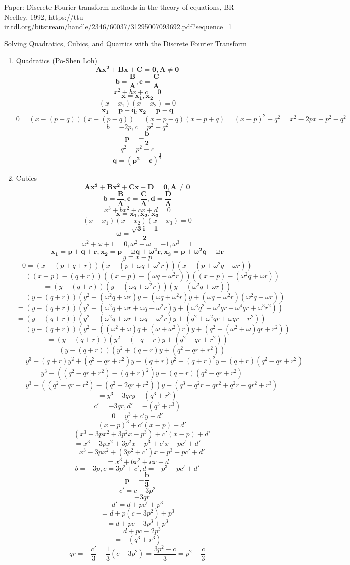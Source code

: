 \documentclass{article}
\begin{document}
Paper: Discrete Fourier transform methods in the theory of equations, BR Neelley, 1992, https://ttu-ir.tdl.org/bitstream/handle/2346/60037/31295007093692.pdf?sequence=1

Solving Quadratics, Cubics, and Quartics with the Discrete Fourier Transform

\begin{enumerate}
\item Quadratics (Po-Shen Loh)
  \[\bm{Ax^2+Bx+C=0, A\neq0}\]
  \[\bm{b=\frac{B}{A}, c=\frac{C}{A}}\]
  \[x^2+bx+c=0\]
  \[\bm{x=x_1,x_2}\]
  \[(x-x_1)(x-x_2)=0\]
  \[\bm{x_1=p+q, x_2=p-q}\]
  \[0=(x-(p+q))(x-(p-q))=(x-p-q)(x-p+q)=(x-p)^2-q^2=x^2-2px+p^2-q^2\]
  \[b=-2p, c=p^2-q^2\]
  \[\bm{p=-\frac{b}{2}}\]
  \[q^2=p^2-c\]
  \[\bm{q=(p^2-c)^\frac{1}{2}}\]
  \newpage
\item Cubics
  \[\bm{Ax^3+Bx^2+Cx+D=0, A\neq0}\]
  \[\bm{b=\frac{B}{A}, c=\frac{C}{A}, d=\frac{D}{A}}\]
  \[x^3+bx^2+cx+d=0\]
  \[\bm{x=x_1,x_2,x_3}\]
  \[(x-x_1)(x-x_2)(x-x_3)=0\]
  \[\bm{\omega=\frac{\sqrt{3}i-1}{2}}\]
  \[\omega^2+\omega+1=0, \omega^2+\omega=-1, \omega^3=1\]
  \[\bm{x_1=p+q+r, x_2=p+\omega q+\omega^2r, x_3=p+\omega^2q+\omega r}\]
  \[y=x-p\]
  \[0=(x-(p+q+r))(x-(p+\omega q+\omega^2r))(x-(p+\omega^2q+\omega r))\]
  \[=((x-p)-(q+r))((x-p)-(\omega q+\omega^2r))((x-p)-(\omega^2q+\omega r))\]
  \[=(y-(q+r))(y-(\omega q+\omega^2r))(y-(\omega^2q+\omega r))\]
  \[=(y-(q+r))(y^2-(\omega^2q+\omega r)y-(\omega q+\omega^2r)y+(\omega q+\omega^2r)(\omega^2q+\omega r))\]
  \[=(y-(q+r))(y^2-(\omega^2q+\omega r+\omega q+\omega^2r)y+(\omega^3q^2+\omega^2qr+\omega^4qr+\omega^3r^2))\]
  \[=(y-(q+r))(y^2-(\omega^2q+\omega r+\omega q+\omega^2r)y+(q^2+\omega^2qr+\omega qr+r^2))\]
  \[=(y-(q+r))(y^2-((\omega^2+\omega)q+(\omega+\omega^2)r)y+(q^2+(\omega^2+\omega)qr+r^2))\]
  \[=(y-(q+r))(y^2-(-q-r)y+(q^2-qr+r^2))\]
  \[=(y-(q+r))(y^2+(q+r)y+(q^2-qr+r^2))\]
  \[=y^3+(q+r)y^2+(q^2-qr+r^2)y-(q+r)y^2-(q+r)^2y-(q+r)(q^2-qr+r^2)\]
  \[=y^3+((q^2-qr+r^2)-(q+r)^2)y-(q+r)(q^2-qr+r^2)\]
  \[=y^3+((q^2-qr+r^2)-(q^2+2qr+r^2))y-(q^3-q^2r+qr^2+q^2r-qr^2+r^3)\]
  \[=y^3-3qry-(q^3+r^3)\]
  \[c'=-3qr, d'=-(q^3+r^3)\]
  \[0=y^3+c'y+d'\]
  \[=(x-p)^3+c'(x-p)+d'\]
  \[=(x^3-3px^2+3p^2x-p^3)+c'(x-p)+d'\]
  \[=x^3-3px^2+3p^2x-p^3+c'x-pc'+d'\]
  \[=x^3-3px^2+(3p^2+c')x-p^3-pc'+d'\]
  \[=x^3+bx^2+cx+d\]
  \[b=-3p, c=3p^2+c', d=-p^3-pc'+d'\]
  \[\bm{p=-\frac{b}{3}}\]
  \[c'=c-3p^2\]
  \[=-3qr\]
  \[d'=d+pc'+p^3\]
  \[=d+p(c-3p^2)+p^3\]  
  \[=d+pc-3p^3+p^3\]  
  \[=d+pc-2p^3\]  
  \[=-(q^3+r^3)\]
  \[qr=-\frac{c'}{3}-\frac{1}{3}(c-3p^2)=\frac{3p^2-c}{3}=p^2-\frac{c}{3}\]

\end{enumerate}
\end{document}
